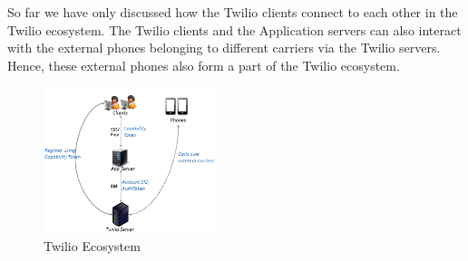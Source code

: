 So far we have only discussed how the Twilio clients connect to each other in the Twilio ecosystem. The Twilio clients and the Application servers can also interact with the external phones belonging to different carriers via the Twilio servers. Hence, these external phones also form a part of the Twilio ecosystem.

\begin{figure}
\centering
  \centering
  \includegraphics[width=0.45\textwidth]{figs/Ecosystem.png}
\caption{Twilio Ecosystem}
\label{fig:ecosystem}
\end{figure}     



